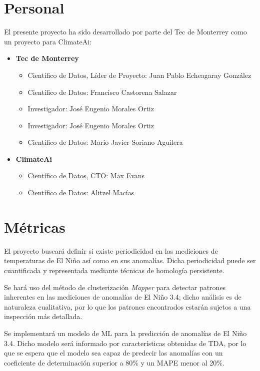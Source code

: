 \documentclass{article}
\begin{document}
    \section{Personal}

        El presente proyecto ha sido desarrollado por parte del Tec de Monterrey como un proyecto para ClimateAi:
        \begin{itemize}
            \item \textbf{Tec de Monterrey}
            \begin{itemize}
                \item Científico de Datos, Líder de Proyecto: Juan Pablo Echeagaray González
                \item Científico de Datos: Francisco Castorena Salazar
                \item Investigador: José Eugenio Morales Ortiz
                \item Investigador: José Eugenio Morales Ortiz
                \item Científico de Datos: Mario Javier Soriano Aguilera
            \end{itemize}
            \item \textbf{ClimateAi}
            \begin{itemize}
                \item Científico de Datos, CTO: Max Evans
                \item Científico de Datos: Alitzel Macías
            \end{itemize}
        \end{itemize}

    \section{Métricas}

        El proyecto buscará definir si existe periodicidad en las mediciones de temperaturas de El Niño así como en sus anomalías. Dicha periodicidad puede ser cuantificada y representada mediante técnicas de homología persistente.

        Se hará uso del método de clusterización \emph{Mapper} para detectar patrones inherentes en las mediciones de anomalías de El Niño 3.4; dicho análisis es de naturaleza cualitativa, por lo que los patrones encontrados estarán sujetos a una inspección más detallada.

        Se implementará un modelo de ML para la predicción de anomalías de El Niño 3.4. Dicho modelo será informado por características obtenidas de TDA, por lo que se espera que el modelo sea capaz de predecir las anomalías con un coeficiente de determinación superior a 80\% y un MAPE menor al 20\%.
\end{document}
